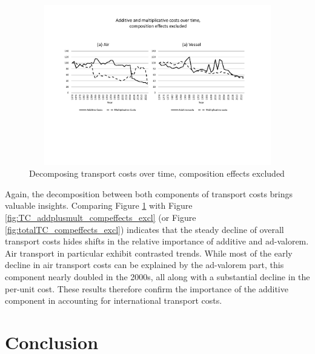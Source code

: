 \documentclass[a4paper,11pt]{article}
\begin{document}
\begin{figure}[htbp]
\caption{Decomposing transport costs over time,
composition effects excluded}
\label{fig:TC_add_mult_compeffects_excl}
\begin{center}
\includegraphics[width=14cm, height=7cm]{Fig3b_TCovertime_add_et_mult_3d.pdf}
\end{center}
\end{figure}

Again, the decomposition between both components of transport costs brings valuable insights. Comparing Figure \ref{fig:TC_add_mult_compeffects_excl} with Figure \ref{fig:TC_addplusmult_compeffects_excl} (or Figure \ref{fig:totalTC_compeffects_excl}) indicates that the steady decline of overall transport costs hides shifts in the relative importance of additive and ad-valorem. Air transport in particular exhibit contrasted trends. While most of the early decline in air transport costs can be explained by the ad-valorem part, this component nearly doubled in the 2000s, all along with a substantial decline in the per-unit cost. These results therefore confirm the importance of the additive component in accounting for international transport costs.\smallskip

\section{Conclusion \label{sec:conclu}}
\end{document}
